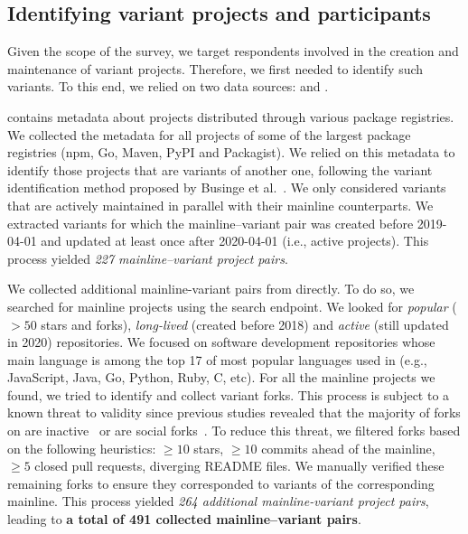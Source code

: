 

\subsection{Identifying variant projects and participants}
\label{sec:forks_and_participants}

Given the scope of the survey, we target respondents involved in the creation and maintenance of variant projects.
Therefore, we first needed to identify such variants.
To this end, we relied on two data sources: \librariesio and \gh.

\librariesio contains metadata about projects distributed through various package registries. We collected the metadata for all projects of some of the largest package registries (\textsf{npm, Go, Maven, PyPI} and \textsf{Packagist}). We relied on this metadata to identify those projects that are variants of another one, following the variant identification method proposed by  Businge et al.~\cite{businge:emse:2021,businge:benevol:2020}. %
We only considered variants that are actively maintained in parallel with their mainline counterparts. We extracted variants for which the mainline--variant pair was created before 2019-04-01 and updated at least once after 2020-04-01 (i.e., active projects).
This process yielded \textit{227 mainline–variant project pairs}.

We collected additional mainline-variant pairs from \gh directly.
To do so, we searched for mainline projects using the \gh search endpoint. We looked for \emph{popular} ($>50$ stars and forks), \emph{long-lived} (created before 2018) and \emph{active} (still updated in 2020) repositories.
We focused on software development repositories whose main language is among the top 17 of most popular languages used in \gh (e.g., \textsf{JavaScript, Java, Go, Python, Ruby, C}, etc).
For all the mainline projects we found, we tried to  identify and collect variant forks. This process is subject to a known threat to validity since previous studies revealed that the majority of forks on \gh are inactive~\cite{businge:2019Saner,Businge:2017} or are social forks~\cite{businge:2018icsme}.
To reduce this threat, we filtered forks based on  the following heuristics: $\geq 10$ stars, $\geq 10$ commits ahead of the mainline, $\geq 5$ closed pull requests, diverging \textsf{README} files.
We manually verified these remaining forks to ensure they corresponded to variants  of the corresponding mainline.
This process yielded \textit{264 additional mainline-variant project pairs},
leading to \textbf{a total of 491 collected mainline--variant pairs}.

